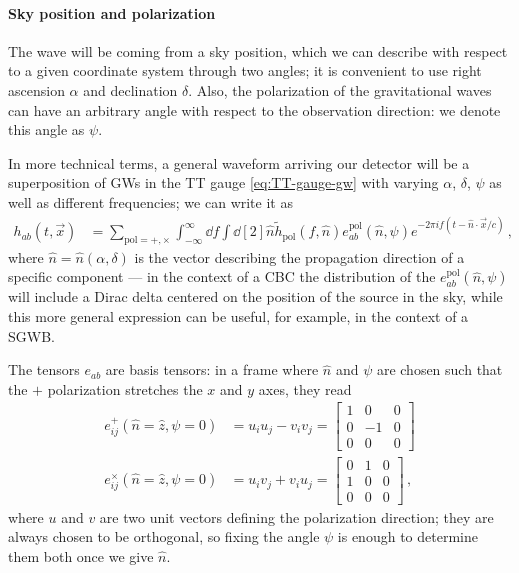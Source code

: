 \documentclass[main.tex]{subfiles}
\begin{document}
\paragraph{Sky position and polarization} \label{sec:sky-pos-polar}

The wave will be coming from a sky position, which we can describe with respect to a given coordinate system through two angles; it is convenient to use right ascension \(\alpha \) and declination \(\delta \). 
Also, the polarization of the gravitational waves can have an arbitrary angle with respect to the observation direction: we denote this angle as \(\psi \). 

In more technical terms, a general waveform arriving our detector will be a superposition of \acsp{GW} in the TT gauge \eqref{eq:TT-gauge-gw} with varying \(\alpha \), \(\delta \), \(\psi \) as well as different frequencies; we can write it as \cite[eq.\ 1.58]{maggioreGravitationalWavesVolume2007}
%
\begin{align} \label{eq:generic-gw}
h_{ab} (t, \vec{x}) &= \sum _{\text{pol} = +, \times }
\int_{- \infty  }^{\infty } \dd{f} \int \dd[2]{\hat{n}} \widetilde{h}_{\text{pol}} (f, \hat{n}) e^{\text{pol}}_{ab}(\hat{n}, \psi ) e^{-2 \pi i f (t - \hat{n}\cdot \vec{x} / c )} 
\,,
\end{align}
%
where \(\hat{n} = \hat{n} (\alpha , \delta )\) is the vector describing the propagation direction of a specific component --- in the context of a \ac{CBC} the distribution of the \(e^{\text{pol}}_{ab}(\hat{n}, \psi )\) will include a Dirac delta centered on the position of the source in the sky, while this more general expression can be useful, for example, in the context of a \ac{SGWB}. 

The tensors \(e_{ab}\) are basis tensors: in a frame where \(\hat{n}\) and \(\psi \) are chosen such that the \(+\) polarization stretches the \(x\) and \(y\) axes, they read 
%
\begin{align}
e_{ij}^{+} (\hat{n}=\hat{z}, \psi =0) &= u_i u_j - v_i v_j = \left[\begin{array}{ccc}
1 & 0 & 0 \\ 
0 & -1 & 0 \\ 
0 & 0 & 0
\end{array}\right]  \\
e_{ij}^{ \times } (\hat{n}=\hat{z}, \psi = 0) &= u_i v_j + v_i u_j = \left[\begin{array}{ccc}
0 & 1 & 0 \\ 
1 & 0 & 0 \\ 
0 & 0 & 0
\end{array}\right]
\,,
\end{align}
%
where \(u\) and \(v\) are two unit vectors defining the polarization direction; they are always chosen to be orthogonal, so fixing the angle \(\psi \) is enough to determine them both once we give \(\hat{n}\). 
\end{document}

